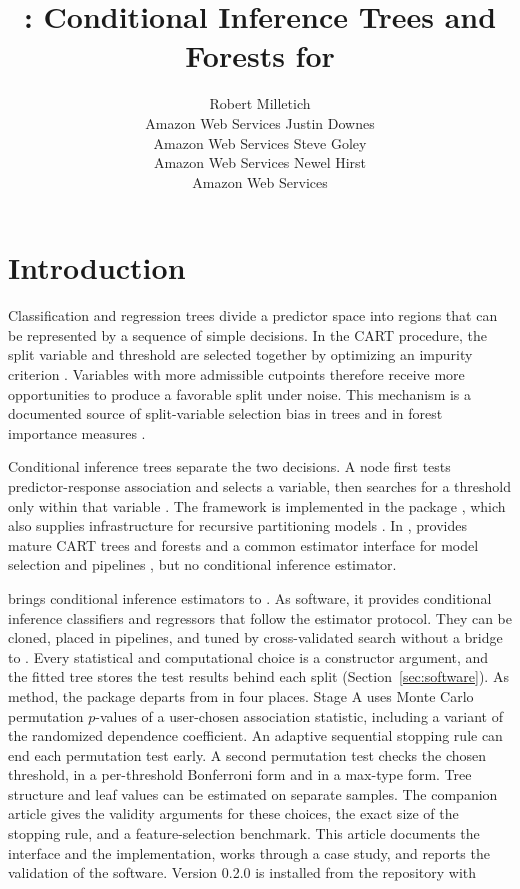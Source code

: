 \documentclass[article]{jss}
\author{Robert Milletich\\Amazon Web Services
  \And Justin Downes\\Amazon Web Services
  \And Steve Goley\\Amazon Web Services
  \And Newel Hirst\\Amazon Web Services}
\title{\citrees: Conditional Inference Trees and Forests for \proglang{Python}}
\newcommand{\citrees}{\pkg{citrees}\xspace}
\newcommand{\sklearn}{\pkg{scikit-learn}\xspace}
\begin{document}
\section{Introduction} \label{sec:introduction}

Classification and regression trees divide a predictor space into regions that
can be represented by a sequence of simple decisions. In the CART procedure,
the split variable and threshold are selected together by optimizing an
impurity criterion \citep{Breiman+Friedman+Olshen+Stone:1984}. Variables with
more admissible cutpoints therefore receive more opportunities to produce a
favorable split under noise. This mechanism is a documented source of
split-variable selection bias in trees and in forest importance measures
\citep{Strobl+Boulesteix+Zeileis+Hothorn:2007}.

Conditional inference trees separate the two decisions. A node first tests
predictor-response association and selects a variable, then searches for a
threshold only within that variable \citep{Hothorn+Hornik+Zeileis:2006}. The
framework is implemented in the  package , which also
supplies infrastructure for recursive partitioning models
\citep{Hothorn+Zeileis:2015}. In , \sklearn provides mature
CART trees and forests and a common estimator interface for model selection
and pipelines \citep{Pedregosa+Varoquaux+Gramfort:2011}, but no conditional
inference estimator.

\citrees brings conditional inference estimators to . As software,
it provides conditional inference classifiers and regressors that follow the
\sklearn estimator protocol. They can be cloned, placed in pipelines, and
tuned by cross-validated search without a bridge to . Every
statistical and computational choice is a constructor argument, and the
fitted tree stores the test results behind each split
(Section~\ref{sec:software}). As method, the package departs from
 in four places. Stage A uses Monte Carlo permutation $p$-values
of a user-chosen association statistic, including a variant of the randomized
dependence coefficient. An adaptive sequential stopping rule can end each
permutation test early. A second permutation test checks the chosen
threshold, in a per-threshold Bonferroni form and in a max-type form. Tree
structure and leaf values can be estimated on separate samples. The companion
article \citep{Milletich+Downes+Goley+Hirst:2026} gives the validity arguments
for these choices, the exact size of the stopping rule, and a
feature-selection benchmark. This article documents the interface and the
implementation, works through a case study, and reports the validation of the
software. Version 0.2.0 is installed from the repository with
%
\begin{CodeChunk}
\end{CodeChunk}
\end{document}
